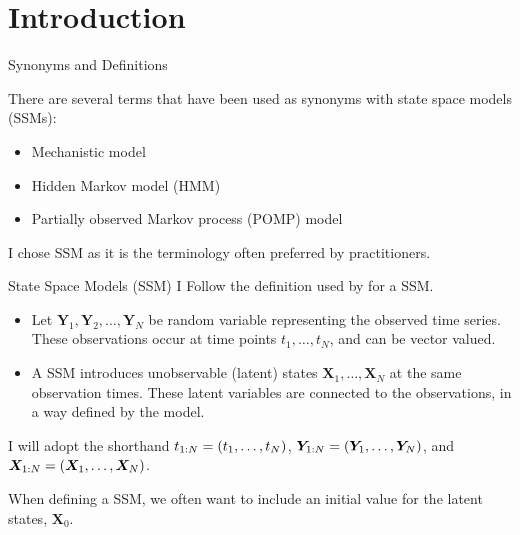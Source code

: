 \documentclass[aspectratio=169]{beamer}\usepackage[]{graphicx}\usepackage[]{xcolor}
\begin{document}
\section{Introduction}

\begin{frame}{Synonyms and Definitions}

There are several terms that have been used as synonyms with state space models (SSMs):

\begin{itemize}
  \item Mechanistic model
  \item Hidden Markov model (HMM)
  \item Partially observed Markov process (POMP) model
\end{itemize}

I chose SSM as it is the terminology often preferred by practitioners.
\end{frame}

\begin{frame}{State Space Models (SSM)}
  I Follow the definition used by \citet{durbin12} for a SSM.
  
  \begin{itemize}
  \item Let $\bm{Y}_{1}, \bm{Y}_2, \ldots, \bm{Y}_{N}$ be random variable representing the observed time series. These observations occur at time points $t_1, \ldots, t_N$, and can be vector valued. 
  \item A SSM introduces unobservable (latent) states $\bm{X}_1, \ldots, \bm{X}_N$ at the same observation times. These latent variables are connected to the observations, in a way defined by the model.
  \end{itemize}
  
  I will adopt the shorthand $t_{{1}:{N}} = (t_1, \ldots, t_N)$, $\bm{Y}_{{1}:{N}} = (\bm{Y}_{1}, \ldots, \bm{Y}_{N})$, and $\bm{X}_{{1}:{N}} = (\bm{X}_1, \ldots, \bm{X}_N)$.
  
  When defining a SSM, we often want to include an initial value for the latent states, $\bm{X}_0$.

\end{frame}
\end{document}
